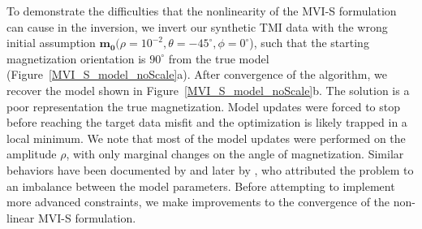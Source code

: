 \documentclass[paper]{geophysics}
\begin{document}
To demonstrate the difficulties that the nonlinearity of the MVI-S formulation can cause in the inversion, we invert our synthetic TMI data with the wrong initial assumption $\mathbf{m_0}(\rho=10^{-2}, \theta=-45^{\circ}, \phi=0^{\circ}$), such that the starting magnetization orientation is  $90^\circ$ from the true model (Figure~\ref{MVI_S_model_noScale}a). After convergence of the algorithm, we recover the model shown in Figure~\ref{MVI_S_model_noScale}b. The solution is a poor representation the true magnetization. Model updates were forced to stop before reaching the target data misfit and the optimization is likely trapped in a local minimum. We note that most of the model updates were performed on the amplitude $\rho$, with only marginal changes on the angle of magnetization. Similar behaviors have been documented by \cite{LelievreOldenburg2009} and later by \cite{Liu2017}, who attributed  the problem to an imbalance between the model parameters. Before attempting to implement more advanced constraints, we make improvements to the convergence of the non-linear MVI-S formulation.
\end{document}
